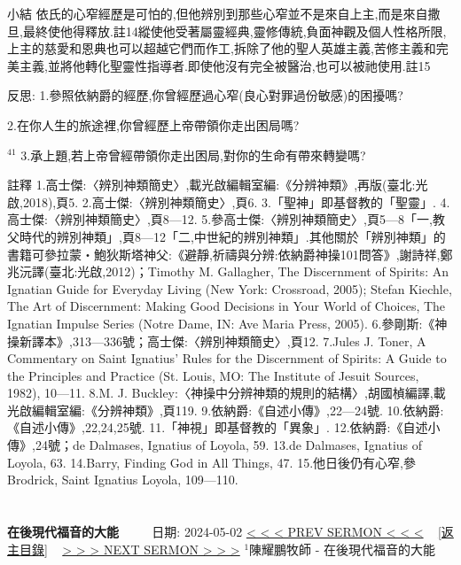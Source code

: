 \documentclass{book}
\begin{document}
小結
依氏的心窄經歷是可怕的,但他辨別到那些心窄並不是來自上主,而是來自撒旦,最終使他得釋放.註14縱使他受著屬靈經典,靈修傳統,負面神觀及個人性格所限,上主的慈愛和恩典也可以超越它們而作工,拆除了他的聖人英雄主義,苦修主義和完美主義,並將他轉化聖靈性指導者.即使他沒有完全被醫治,也可以被祂使用.註15

反思:
1.參照依納爵的經歷,你曾經歷過心窄(良心對罪過份敏感)的困擾嗎?

2.在你人生的旅途裡,你曾經歷上帝帶領你走出困局嗎?

$^{41}$
3.承上題,若上帝曾經帶領你走出困局,對你的生命有帶來轉變嗎?

註釋
1.高士傑:〈辨別神類簡史〉,載光啟編輯室編:《分辨神類》,再版(臺北:光啟,2018),頁5.
2.高士傑:〈辨別神類簡史〉,頁6.
3.「聖神」即基督教的「聖靈」.
4.高士傑:〈辨別神類簡史〉,頁8—12.
5.參高士傑:〈辨別神類簡史〉,頁5—8「一,教父時代的辨別神類」,頁8—12「二,中世紀的辨別神類」.其他關於「辨別神類」的書籍可參拉蒙‧鮑狄斯塔神父:《避靜,祈禱與分辨:依納爵神操101問答》,謝詩祥,鄭兆沅譯(臺北:光啟,2012)；Timothy M. Gallagher, The Discernment of Spirits: An Ignatian Guide for Everyday Living (New York: Crossroad, 2005); Stefan Kiechle, The Art of Discernment: Making Good Decisions in Your World of Choices, The Ignatian Impulse Series (Notre Dame, IN: Ave Maria Press, 2005).
6.參剛斯:《神操新譯本》,313—336號；高士傑:〈辨別神類簡史〉,頁12.
7.Jules J. Toner, A Commentary on Saint Ignatius’ Rules for the Discernment of Spirits: A Guide to the Principles and Practice (St. Louis, MO: The Institute of Jesuit Sources, 1982), 10—11.
8.M. J. Buckley:〈神操中分辨神類的規則的結構〉,胡國楨編譯,載光啟編輯室編:《分辨神類》,頁119.
9.依納爵:《自述小傳》,22—24號.
10.依納爵:《自述小傳》,22,24,25號.
11.「神視」即基督教的「異象」.
12.依納爵:《自述小傳》,24號；de Dalmases, Ignatius of Loyola, 59.
13.de Dalmases, Ignatius of Loyola, 63.
14.Barry, Finding God in All Things, 47.
15.他日後仍有心窄,參Brodrick, Saint Ignatius Loyola, 109—110.
\newpage



\section{}
\label{sec:13}
\textbf{在後現代福音的大能}
\newline
\newline
~~~~ 日期: 2024-05-02
\newline
\newline
\hyperref[sec:12]{\small{< < < PREV SERMON < < <}}
~
\hyperref[sec:index]{\small{[返主目錄]}}
~
\hyperref[sec:14]{\small{> > > NEXT SERMON > > >}}
\newline
\newline
$^{1}$陳耀鵬牧師 - 在後現代福音的大能
\end{document}
